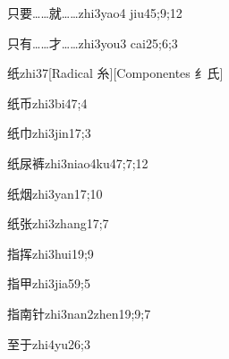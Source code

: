 \begin{verbete}{只要……就……}{zhi3yao4 jiu4}{5;9;12}
\end{verbete}

\begin{verbete}{只有……才……}{zhi3you3 cai2}{5;6;3}
\end{verbete}

\begin{verbete}{纸}{zhi3}{7}[Radical 糸][Componentes 纟氏]
\end{verbete}

\begin{verbete}{纸币}{zhi3bi4}{7;4}
\end{verbete}

\begin{verbete}{纸巾}{zhi3jin1}{7;3}
\end{verbete}

\begin{verbete}{纸尿裤}{zhi3niao4ku4}{7;7;12}
\end{verbete}

\begin{verbete}{纸烟}{zhi3yan1}{7;10}
\end{verbete}

\begin{verbete}{纸张}{zhi3zhang1}{7;7}
\end{verbete}

\begin{verbete}{指挥}{zhi3hui1}{9;9}
\end{verbete}

\begin{verbete}{指甲}{zhi3jia5}{9;5}
\end{verbete}

\begin{verbete}{指南针}{zhi3nan2zhen1}{9;9;7}
\end{verbete}

\begin{verbete}{至于}{zhi4yu2}{6;3}
\end{verbete}

